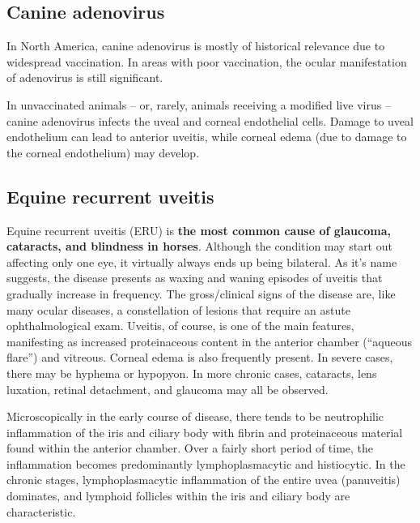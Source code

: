 \documentclass[openany]{article}
\begin{document}
\subsection{Canine adenovirus}\label{canine-adenovirus}

In North America, canine adenovirus is mostly of historical relevance
due to widespread vaccination. In areas with poor vaccination, the
ocular manifestation of adenovirus is still significant.

In unvaccinated animals -- or, rarely, animals receiving a modified live
virus -- canine adenovirus infects the uveal and corneal endothelial
cells. Damage to uveal endothelium can lead to anterior uveitis, while
corneal edema (due to damage to the corneal endothelium) may develop.

\hypertarget{equine-recurrent-uveitis}{\subsection{Equine recurrent
uveitis}\label{equine-recurrent-uveitis}}

Equine recurrent uveitis (ERU) is \textbf{the most common cause of
glaucoma, cataracts, and blindness in horses}. Although the condition
may start out affecting only one eye, it virtually always ends up being
bilateral. As it's name suggests, the disease presents as waxing and
waning episodes of uveitis that gradually increase in frequency. The
gross/clinical signs of the disease are, like many ocular diseases, a
constellation of lesions that require an astute ophthalmological exam.
Uveitis, of course, is one of the main features, manifesting as
increased proteinaceous content in the anterior chamber (``aqueous
flare'') and vitreous. Corneal edema is also frequently present. In
severe cases, there may be hyphema or hypopyon. In more chronic cases,
cataracts, lens luxation, retinal detachment, and glaucoma may all be
observed.

Microscopically in the early course of disease, there tends to be
neutrophilic inflammation of the iris and ciliary body with fibrin and
proteinaceous material found within the anterior chamber. Over a fairly
short period of time, the inflammation becomes predominantly
lymphoplasmacytic and histiocytic. In the chronic stages,
lymphoplasmacytic inflammation of the entire uvea (panuveitis)
dominates, and lymphoid follicles within the iris and ciliary body are
characteristic.
\end{document}
